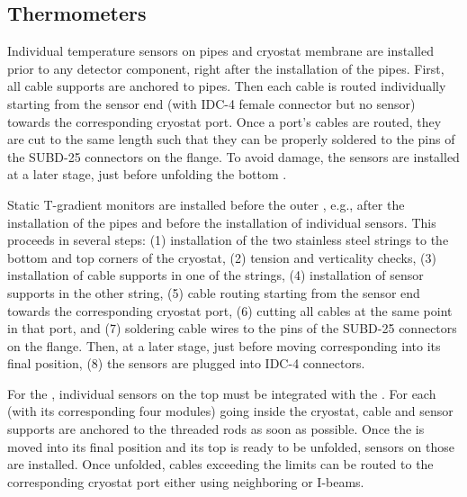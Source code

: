 \subsection{Thermometers}
\label{sec:fdgen-slow-cryo-instal-th}


Individual temperature sensors on pipes and cryostat membrane are installed prior to any detector component, right after the installation of the pipes.
First, all cable supports are anchored to pipes. Then each cable is routed individually starting from the sensor end (with IDC-4 female connector but no sensor)
towards the corresponding cryostat port. Once a port's cables are routed, %
they are cut to the same length such that they can be properly soldered
to the pins of the SUBD-25 connectors on the flange. 
To avoid damage, the sensors are installed at a later stage, just before unfolding the bottom .

Static T-gradient monitors are installed before the outer , e.g., %
after the installation of the pipes
and before the installation of individual sensors. This proceeds in several steps: (1) installation of the two stainless steel strings to the bottom and top corners of the cryostat,
(2) tension and verticality checks, (3) installation of cable supports in one of the strings, (4) installation of sensor supports in the other string, (5) cable routing starting from
the sensor end towards the corresponding cryostat port, (6) cutting all cables at the same point in that port, and (7) soldering cable wires to the pins of the SUBD-25 connectors on the flange. Then, at a later stage, just before moving corresponding  into its final position, (8) the sensors are plugged into IDC-4 connectors. 

For the \single{}, individual sensors on the top  must be integrated with the . For each  (with its corresponding four  modules)
going inside the cryostat, cable and sensor supports are anchored to the  threaded rods as soon as possible.
Once the  is moved into its final position and its top  is ready to be unfolded, sensors on those  are installed. Once unfolded, cables 
exceeding the  limits can be routed to the corresponding cryostat port either using neighboring  or  I-beams. 


